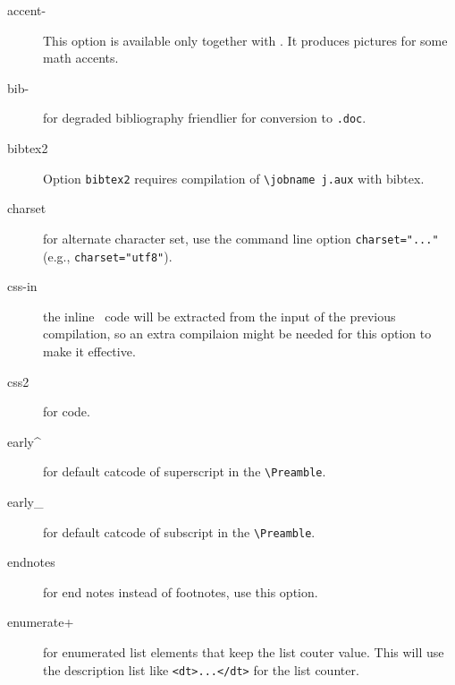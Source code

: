 \begin{description}
\item[accent-] This option is available only together with
  . It produces pictures for some math accents.


\item[bib-] for degraded bibliography friendlier for conversion to
  \verb=.doc=.

\item[bibtex2] Option \verb=bibtex2= requires compilation of
  \verb=\jobname j.aux= with bibtex.


\item[charset] for alternate character set, use the command line
  option \verb+charset="..."+ (e.g., \verb+charset="utf8"+).


\item[css-in] the inline \css\ code will be extracted from the input of
  the previous compilation, so an extra compilaion might be needed for
  this option to make it effective.

\item[css2] for  code.


\item[early\textasciicircum] for default catcode of superscript in the
  \verb=\Preamble=.

\item[early\_] for default catcode of subscript in the
  \verb=\Preamble=.


\item[endnotes] for end notes instead of footnotes, use this option.


\item[enumerate+] for enumerated list elements that keep the list couter value. This
  will use the description list like \verb=<dt>...</dt>= for the list
  counter.


\end{description}

